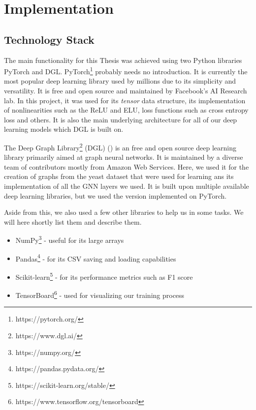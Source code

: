 \documentclass[times, utf8, diplomski, english]{fer_eng}
\begin{document}
\chapter{Implementation}

\section{Technology Stack}

The main functionality for this Thesis was achieved using two Python libraries PyTorch and DGL. PyTorch\footnote{https://pytorch.org/} probably needs no introduction. It is currently the most popular deep learning library used by millions due to its simplicity and versatility. It is free and open source and maintained by Facebook's AI Research lab. In this project, it was used for its \textit{tensor} data structure, its implementation of nonlinearities such as the ReLU and ELU, loss functions such as cross entropy loss and others. It is also the main underlying architecture for all of our deep learning models which DGL is built on.

The Deep Graph Library\footnote{https://www.dgl.ai/} (DGL) (\cite{DGL}) is an free and open source deep learning library primarily aimed at graph neural networks. It is maintained by a diverse team of contributors mostly from Amazon Web Services. Here, we used it for the creation of graphs from the yeast dataset that were used for learning ans its implementation of all the GNN layers we used. It is built upon multiple available deep learning libraries, but we used the version implemented on PyTorch.

Aside from this, we also used a few other libraries to help us in some tasks. We will here shortly list them and describe them.

\begin{itemize}
	\item NumPy\footnote{https://numpy.org/} - useful for its large arrays

	\item Pandas\footnote{https://pandas.pydata.org/} - for its CSV saving and loading capabilities

	\item Scikit-learn\footnote{https://scikit-learn.org/stable/} - for its performance metrics such as F1 score

	\item TensorBoard\footnote{https://www.tensorflow.org/tensorboard} - used for visualizing our training process
\end{itemize}
\end{document}
